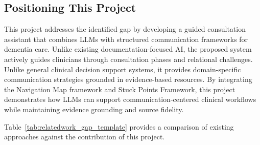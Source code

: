 \subsection{Positioning This Project}

This project addresses the identified gap by developing a guided consultation assistant that combines LLMs with structured communication frameworks for dementia care. Unlike existing documentation-focused AI, the proposed system actively guides clinicians through consultation phases and relational challenges. Unlike general clinical decision support systems, it provides domain-specific communication strategies grounded in evidence-based resources. By integrating the Navigation Map framework and Stuck Points Framework, this project demonstrates how LLMs can support communication-centered clinical workflows while maintaining evidence grounding and source fidelity.

Table~\ref{tab:relatedwork_gap_template} provides a comparison of existing approaches against the contribution of this project.




